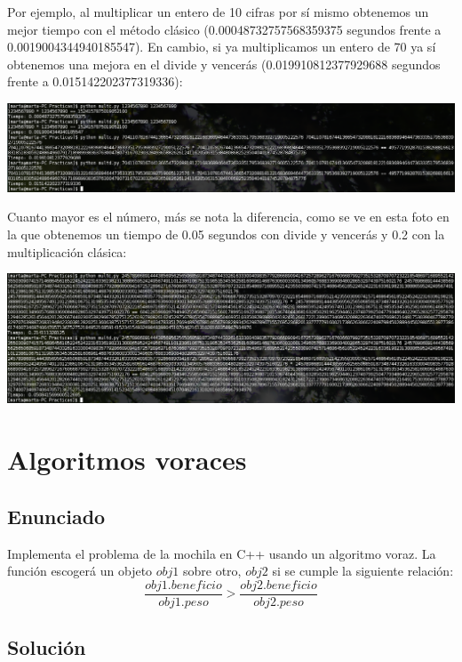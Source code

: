 \documentclass[10pt,a4paper,spanish]{report}
\begin{document}
Por ejemplo, al multiplicar un entero de 10 cifras por sí mismo obtenemos un mejor tiempo con el método clásico (0.00048732757568359375 segundos frente a 0.0019004344940185547). En cambio, si ya multiplicamos un entero de 70 ya sí obtenemos una mejora en el divide y vencerás (0.019910812377929688 segundos frente a 0.015142202377319336):

\begin{center}
\includegraphics[width=1.2\textwidth]{comparacion_dyv1}
\end{center}

Cuanto mayor es el número, más se nota la diferencia, como se ve en esta foto en la que obtenemos un tiempo de 0.05 segundos con divide y vencerás y 0.2 con la multiplicación clásica:

\begin{center}
\includegraphics[width=1.2\textwidth]{comparacion_dyv2}
\end{center}


\chapter{\textcolor[rgb]{0.4,0.4,0.2}Algoritmos voraces}
\section{\textcolor[rgb]{0.5,1,1}Enunciado}
{\Large Implementa el problema de la mochila en C++ usando un algoritmo voraz. La función escogerá un objeto $obj1$ sobre otro, $obj2$ si se cumple la siguiente relación:
\begin{displaymath}
\frac{obj1.beneficio}{obj1.peso} > \frac{obj2.beneficio}{obj2.peso}
\end{displaymath}
}

\section{\textcolor[rgb]{0.8,1,0.2}Solución}
\end{document}
